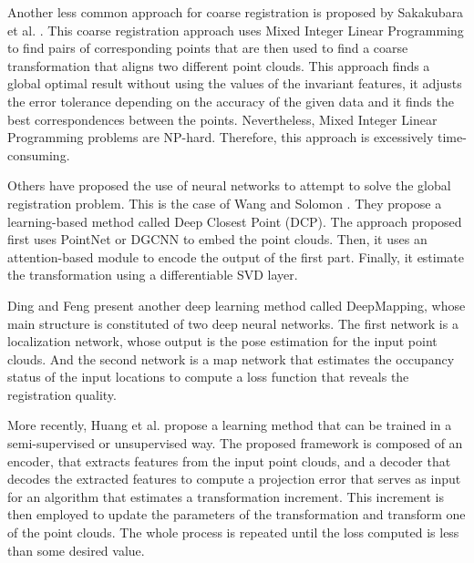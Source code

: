         Another less common approach for coarse registration is proposed by Sakakubara et al. \cite{Sakakubara_2007_automatic}.
        This coarse registration approach uses Mixed Integer Linear Programming to find pairs of corresponding points that are then 
        used to find a coarse transformation that aligns two different point clouds.
        This approach finds a global optimal result without using the values of the invariant features, 
        it adjusts the error tolerance depending on the accuracy of the given data and 
        it finds the best correspondences between the points.
        Nevertheless, Mixed Integer Linear Programming problems are NP-hard. Therefore, this approach is excessively time-consuming.

        Others have proposed the use of neural networks to attempt to solve the global registration problem.
        This is the case of Wang and Solomon \cite{Wang_2019_deepclosest}. They propose a learning-based method called Deep Closest Point (DCP).
        The approach proposed first uses PointNet \cite{Qi_2017_pointnetdeep} or DGCNN \cite{Wang_2019_dynamic} to embed the point clouds.
        Then, it uses an attention-based module to encode the output of the first part.
        Finally, it estimate the transformation using a differentiable SVD layer.

        Ding and Feng \cite{Ding_2019_deepmapping} present another deep learning method called DeepMapping,
        whose main structure is constituted of two deep neural networks.
        The first network is a localization network, whose output is the pose estimation for the input point clouds.
        And the second network is a map network that estimates the occupancy status of the input locations to compute a loss function that reveals
        the registration quality.

        More recently, Huang et al. \cite{Huang_2020_feature} propose a learning method that can be trained in a semi-supervised or unsupervised way.
        The proposed framework is composed of an encoder, that extracts features from the input point clouds, 
        and a decoder that decodes the extracted features to compute a projection error that serves as input for an algorithm that estimates
        a transformation increment. 
        This increment is then employed to update the parameters of the transformation and transform one of the point clouds.
        The whole process is repeated until the loss computed is less than some desired value.
    


